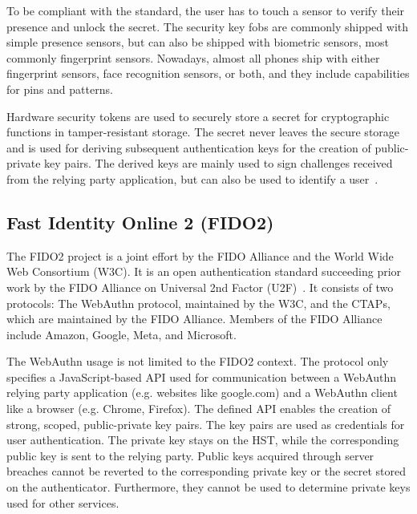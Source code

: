 \documentclass[runningheads]{llncs}
\begin{document}
To be compliant with the standard, the user has to touch a sensor to verify their presence and unlock the secret. The security key fobs are commonly shipped with simple presence sensors, but can also be shipped with biometric sensors, most commonly fingerprint sensors. Nowadays, almost all phones ship with either fingerprint sensors, face recognition sensors, or both, and they include capabilities for pins and patterns.

Hardware security tokens are used to securely store a secret for cryptographic functions in tamper-resistant storage. The secret never leaves the secure storage and is used for deriving subsequent authentication keys for the creation of public-private key pairs. The derived keys are mainly used to sign challenges received from the relying party application, but can also be used to identify a user~\cite{272198}.

\subsection{Fast Identity Online 2 (FIDO2)}
The FIDO2 project is a joint effort by the FIDO Alliance and the World Wide Web Consortium (W3C). It is an open authentication standard succeeding prior work by the FIDO Alliance on Universal 2nd Factor (U2F)~\cite{9152694}. It consists of two protocols: The WebAuthn protocol, maintained by the W3C, and the CTAPs, which are maintained by the FIDO Alliance. Members of the FIDO Alliance include Amazon, Google, Meta, and Microsoft.

The WebAuthn usage is not limited to the FIDO2 context. The protocol only specifies a JavaScript-based API used for communication between a WebAuthn relying party application (e.g. websites like google.com) and a WebAuthn client like a browser (e.g. Chrome, Firefox). The defined API enables the creation of strong, scoped, public-private key pairs. The key pairs are used as credentials for user authentication. The private key stays on the HST, while the corresponding public key is sent to the relying party. Public keys acquired through server breaches cannot be reverted to the corresponding private key or the secret stored on the authenticator. Furthermore, they cannot be used to determine private keys used for other services. 
\end{document}
